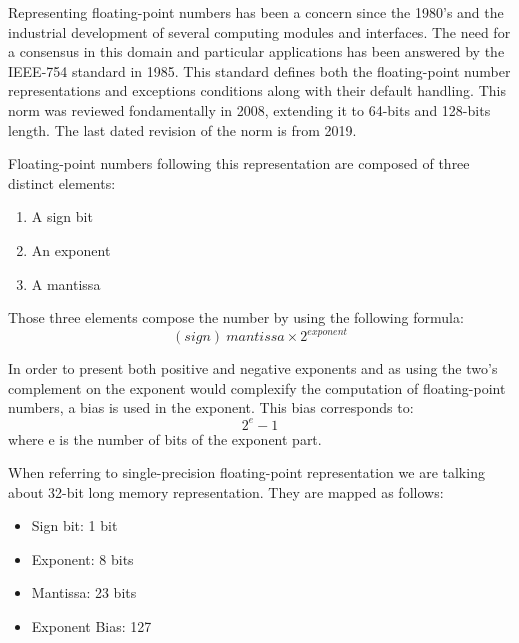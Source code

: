 Representing floating-point numbers has been a concern since the 1980's and the industrial development of several computing modules and interfaces. The need for a consensus in this domain and particular applications has been answered by the IEEE-754 standard \cite{Ieee754} in 1985. This standard defines both the floating-point number representations and exceptions conditions along with their default handling. This norm was reviewed fondamentally in 2008, extending it to 64-bits and 128-bits length. The last dated revision of the norm is from 2019.

Floating-point numbers following this representation are composed of three distinct elements:
\begin{enumerate}
  \item A sign bit
  \item An exponent
  \item A mantissa
\end{enumerate}

Those three elements compose the number by using the following formula:
\begin{equation}
  (sign)\ mantissa \times 2^{exponent}
\end{equation}

In order to present both positive and negative exponents and as using the two's complement on the exponent would complexify the computation of floating-point numbers, a bias is used in the exponent. This bias corresponds to:
\begin{equation}
  2^e - 1
\end{equation}
where e is the number of bits of the exponent part.

When referring to single-precision floating-point representation we are talking about 32-bit long memory representation. They are mapped as follows:
\begin{itemize}
  \item Sign bit: 1 bit
  \item Exponent: 8 bits
  \item Mantissa: 23 bits
  \item Exponent Bias: 127
\end{itemize}


